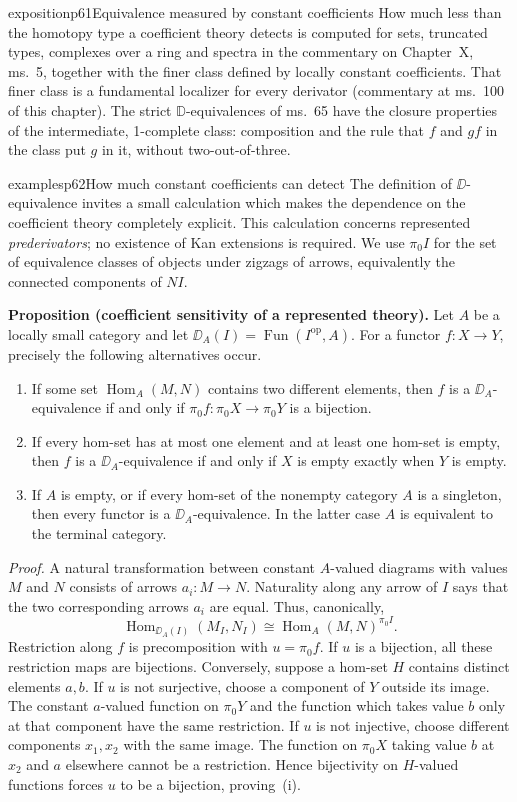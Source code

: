 \begin{dcomment}{exposition}{p61}{Equivalence measured by constant coefficients}
How much less than the homotopy type a coefficient theory detects is computed for sets, truncated types, complexes over a ring and spectra in the commentary on Chapter~X, ms.~5, together with the finer class defined by locally constant coefficients. That finer class is a fundamental localizer for every derivator (commentary at ms.~100 of this chapter). The strict $\mathbb D$-equivalences of ms.~65 have the closure properties of the intermediate, 1-complete class: composition and the rule that $f$ and $gf$ in the class put $g$ in it, without two-out-of-three.
\end{dcomment}

\begin{dcomment}{examples}{p62}{How much constant coefficients can detect}
The definition of $\DD$-equivalence invites a small calculation which makes the dependence on the coefficient theory completely explicit. This calculation concerns represented \emph{prederivators}; no existence of Kan extensions is required. We use $\pi_0I$ for the set of equivalence classes of objects under zigzags of arrows, equivalently the connected components of $NI$.

\textbf{Proposition (coefficient sensitivity of a represented theory).}
Let $A$ be a locally small category and let $\DD_A(I)=\operatorname{Fun}(I^{\mathrm{op}},A)$. For a functor $f:X\to Y$, precisely the following alternatives occur.
\begin{enumerate}[label=\textup{(\roman*)}]
\item If some set $\operatorname{Hom}_A(M,N)$ contains two different elements, then $f$ is a $\DD_A$-equivalence if and only if $\pi_0f:\pi_0X\to\pi_0Y$ is a bijection.
\item If every hom-set has at most one element and at least one hom-set is empty, then $f$ is a $\DD_A$-equivalence if and only if $X$ is empty exactly when $Y$ is empty.
\item If $A$ is empty, or if every hom-set of the nonempty category $A$ is a singleton, then every functor is a $\DD_A$-equivalence. In the latter case $A$ is equivalent to the terminal category.
\end{enumerate}

\emph{Proof.} A natural transformation between constant $A$-valued diagrams with values $M$ and $N$ consists of arrows $a_i:M\to N$. Naturality along any arrow of $I$ says that the two corresponding arrows $a_i$ are equal. Thus, canonically,
\[
\operatorname{Hom}_{\DD_A(I)}(M_I,N_I)
 \cong \operatorname{Hom}_A(M,N)^{\pi_0I}.
\]
Restriction along $f$ is precomposition with $u=\pi_0f$. If $u$ is a bijection, all these restriction maps are bijections. Conversely, suppose a hom-set $H$ contains distinct elements $a,b$. If $u$ is not surjective, choose a component of $Y$ outside its image. The constant $a$-valued function on $\pi_0Y$ and the function which takes value $b$ only at that component have the same restriction. If $u$ is not injective, choose different components $x_1,x_2$ with the same image. The function on $\pi_0X$ taking value $b$ at $x_2$ and $a$ elsewhere cannot be a restriction. Hence bijectivity on $H$-valued functions forces $u$ to be a bijection, proving~(i).


\end{dcomment}
